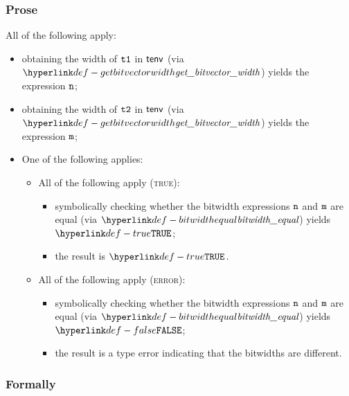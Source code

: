 \subsubsection{Prose}
All of the following apply:
\begin{itemize}
  \item obtaining the width of $\texttt{t1}$ in $\textsf{tenv}$ (via $\getbitvectorwidth$) yields the expression $\texttt{n}$\ProseOrTypeError;
  \item obtaining the width of $\texttt{t2}$ in $\textsf{tenv}$ (via $\getbitvectorwidth$) yields the expression $\texttt{m}$\ProseOrTypeError;
  \item One of the following applies:
  \begin{itemize}
    \item All of the following apply (\textsc{true}):
    \begin{itemize}
      \item symbolically checking whether the bitwidth expressions $\texttt{n}$ and $\texttt{m}$ are equal (via $\bitwidthequal$) yields $\True$;
      \item the result is $\True$.
    \end{itemize}

    \item All of the following apply (\textsc{error}):
    \begin{itemize}
      \item symbolically checking whether the bitwidth expressions $\texttt{n}$ and $\texttt{m}$ are equal (via $\bitwidthequal$) yields $\False$;
      \item the result is a type error indicating that the bitwidths are different.
    \end{itemize}
  \end{itemize}
\end{itemize}

\subsubsection{Formally}
